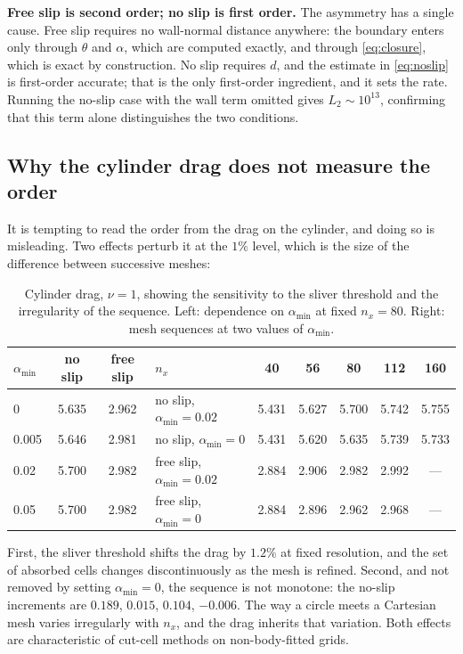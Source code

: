 \documentclass[11pt,a4paper]{article}
\theoremstyle{remark}
\begin{document}
\textbf{Free slip is second order; no slip is first order.} The asymmetry has a single cause.
Free slip requires no wall-normal distance anywhere: the boundary enters only through
$\theta$ and $\alpha$, which are computed exactly, and through \eqref{eq:closure}, which is
exact by construction. No slip requires $d$, and the estimate in \eqref{eq:noslip} is
first-order accurate; that is the only first-order ingredient, and it sets the rate. Running
the no-slip case with the wall term omitted gives $L_2\sim10^{13}$, confirming that this term
alone distinguishes the two conditions.

\subsection{Why the cylinder drag does not measure the order}

It is tempting to read the order from the drag on the cylinder, and doing so is misleading.
Two effects perturb it at the $1\%$ level, which is the size of the difference between
successive meshes:

\begin{table}[h]\centering
\caption{Cylinder drag, $\nu=1$, showing the sensitivity to the sliver threshold and the
irregularity of the sequence. Left: dependence on $\alpha_{\min}$ at fixed $n_x=80$. Right:
mesh sequences at two values of $\alpha_{\min}$.}
\label{tab:dragnoise}
\small
\begin{tabular}{lcc@{\hskip 1.2cm}lccccc}
\toprule
$\alpha_{\min}$ & no slip & free slip & $n_x$ & 40 & 56 & 80 & 112 & 160\\
\midrule
0      & 5.635 & 2.962 & no slip, $\alpha_{\min}=0.02$ & 5.431 & 5.627 & 5.700 & 5.742 & 5.755\\
0.005  & 5.646 & 2.981 & no slip, $\alpha_{\min}=0$    & 5.431 & 5.620 & 5.635 & 5.739 & 5.733\\
0.02   & 5.700 & 2.982 & free slip, $\alpha_{\min}=0.02$ & 2.884 & 2.906 & 2.982 & 2.992 & ---\\
0.05   & 5.700 & 2.982 & free slip, $\alpha_{\min}=0$    & 2.884 & 2.896 & 2.962 & 2.968 & ---\\
\bottomrule
\end{tabular}
\end{table}

First, the sliver threshold shifts the drag by $1.2\%$ at fixed resolution, and the set of
absorbed cells changes discontinuously as the mesh is refined. Second, and not removed by
setting $\alpha_{\min}=0$, the sequence is not monotone: the no-slip increments are
$0.189$, $0.015$, $0.104$, $-0.006$. The way a circle meets a Cartesian mesh varies
irregularly with $n_x$, and the drag inherits that variation. Both effects are characteristic
of cut-cell methods on non-body-fitted grids.
\end{document}
